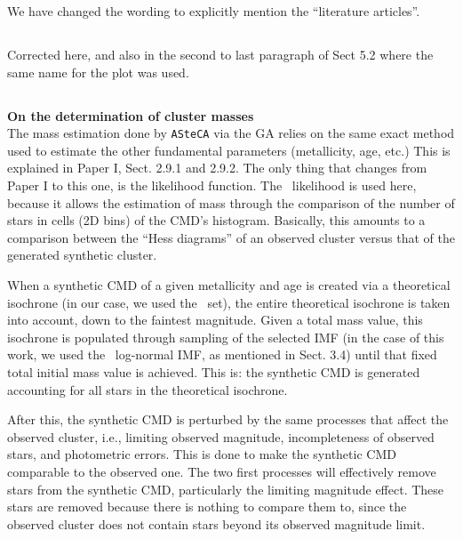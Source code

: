 \documentclass{article}
\begin{document}
We have changed the wording to explicitly mention the ``literature articles''.


\subsection{}
Corrected here, and also in the second to last paragraph of Sect 5.2 where the
same name for the plot was used.

\subsection{}
\label{sec:18}
\textbf{On the determination of cluster masses}\\

The mass estimation done by \texttt{ASteCA} via the GA relies on the same exact
method used to estimate the other fundamental parameters (metallicity, age,
etc.) This is explained in Paper I, Sect. 2.9.1 and 2.9.2. The only thing that
changes from Paper I to this one, is the likelihood function.
The~\cite{Dolphin_2002} likelihood is used here, because it allows the
estimation of mass through the comparison of the number of stars in cells (2D
bins) of the CMD's histogram. Basically, this amounts to a comparison between
the ``Hess diagrams'' of an observed cluster versus that of the generated
synthetic cluster.

When a synthetic CMD of a given metallicity and age is created via a theoretical
isochrone (in our case, we used the~\cite{Bressan_2012} set), the entire
theoretical isochrone is taken into account, down to the faintest magnitude.
%
Given a total mass value, this isochrone is populated through sampling of the
selected IMF (in the case of this work, we used the~\cite{Chabrier_2001}
log-normal IMF, as mentioned in Sect. 3.4) until that fixed total initial mass
value is achieved. This is: the synthetic CMD is generated accounting for all
stars in the theoretical isochrone.

After this, the synthetic CMD is perturbed by the same processes that
affect the observed cluster, i.e., limiting observed magnitude, incompleteness
of observed stars, and photometric errors. This is done to
make the synthetic CMD comparable to the observed one.
%
The two first processes will effectively remove stars from the synthetic CMD,
particularly the limiting magnitude effect. These stars are removed because
there is nothing to compare them to, since the observed cluster does not
contain stars beyond its observed magnitude limit.
%
\end{document}
